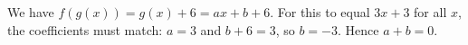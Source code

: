 We have $f(g(x))=g(x)+6=ax+b+6$. For this to equal $3x+3$ for all $x$, the coefficients must match: $a=3$ and $b+6=3$, so $b=-3$. Hence $a+b=\boxed{0}$.
